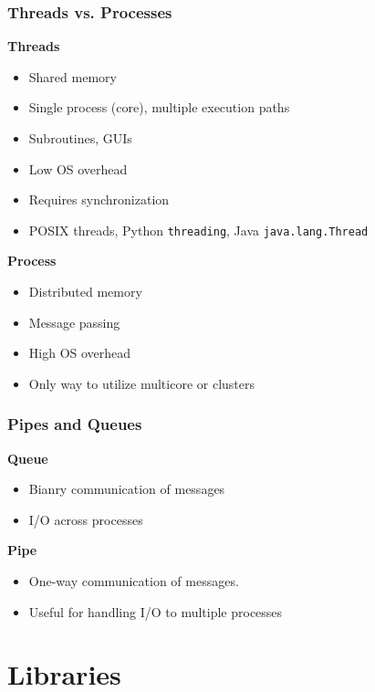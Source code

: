 \documentclass[t]{beamer}
\begin{document}
\begin{frame}
\frametitle{Threads vs. Processes}
\textbf{Threads}
\begin{itemize}
  \item Shared memory
  \item Single process (core), multiple execution paths
  \item Subroutines, GUIs
  \item Low OS overhead
  \item Requires synchronization
  \item POSIX threads, Python \texttt{threading}, Java \texttt{java.lang.Thread}
\end{itemize}

\textbf{Process}
\begin{itemize}
  \item Distributed memory
  \item Message passing
  \item High OS overhead
  \item Only way to utilize multicore or clusters
\end{itemize}

\end{frame}

\begin{frame}
\frametitle{Pipes and Queues}
\textbf{Queue}
\begin{itemize}
  \item Bianry communication of messages
  \item I/O across processes
\end{itemize}

\pause

\textbf{Pipe}
\begin{itemize}
  \item One-way communication of messages. 
  \item Useful for handling I/O to multiple processes
\end{itemize}
\end{frame}



\section{Libraries}
\end{document}
